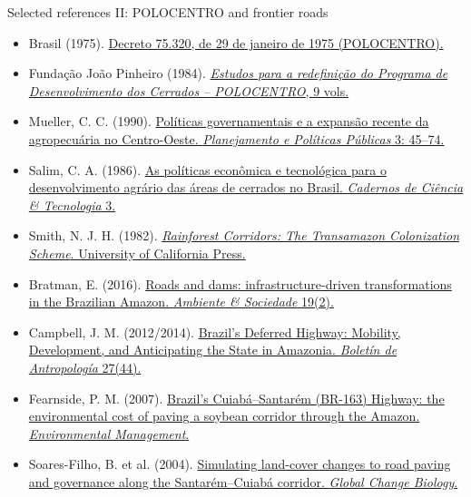 \documentclass[aspectratio=169,10pt]{beamer}
\begin{document}
\begin{frame}{Selected references II: POLOCENTRO and frontier roads}
\tiny
\begin{itemize}\setlength\itemsep{0.35em}
  \item Brasil (1975). \href{https://www2.camara.leg.br/legin/fed/decret/1970-1979/decreto-75320-29-janeiro-1975-423871-publicacaooriginal-1-pe.html}{Decreto 75.320, de 29 de janeiro de 1975 (POLOCENTRO).}
  \item Fundação João Pinheiro (1984). \href{https://www.bibliotecadigital.mg.gov.br/consulta/consultaDetalheDocumento.php?iCodDocumento=55206}{\textit{Estudos para a redefinição do Programa de Desenvolvimento dos Cerrados -- POLOCENTRO}, 9 vols.}
  \item Mueller, C. C. (1990). \href{https://repositorio.ipea.gov.br/bitstream/11058/14764/1/ppp_n3_completo.pdf}{Políticas governamentais e a expansão recente da agropecuária no Centro-Oeste. \textit{Planejamento e Políticas Públicas} 3: 45--74.}
  \item Salim, C. A. (1986). \href{https://doi.org/10.35977/0104-1096.cct1986.v3.9213}{As políticas econômica e tecnológica para o desenvolvimento agrário das áreas de cerrados no Brasil. \textit{Cadernos de Ciência \& Tecnologia} 3.}
  \item Smith, N. J. H. (1982). \href{https://doi.org/10.1525/9780520314320}{\textit{Rainforest Corridors: The Transamazon Colonization Scheme}. University of California Press.}
  \item Bratman, E. (2016). \href{https://doi.org/10.1590/1809-4422ASOC256V1922016}{Roads and dams: infrastructure-driven transformations in the Brazilian Amazon. \textit{Ambiente \& Sociedade} 19(2).}
  \item Campbell, J. M. (2012/2014). \href{https://docs.rwu.edu/fcas_fp/151/}{Brazil's Deferred Highway: Mobility, Development, and Anticipating the State in Amazonia. \textit{Boletín de Antropología} 27(44).}
  \item Fearnside, P. M. (2007). \href{https://repositorio.inpa.gov.br/items/72737248-5a0c-42dd-adf3-82b4a9d622d6}{Brazil's Cuiabá--Santarém (BR-163) Highway: the environmental cost of paving a soybean corridor through the Amazon. \textit{Environmental Management}.}
  \item Soares-Filho, B. et al. (2004). \href{https://ipam.org.br/bibliotecas/simulating-the-response-of-land-cover-changes-to-road-paving-and-governance-along-a-major-amazon-highway-the-santarem-cuiaba-corridor/}{Simulating land-cover changes to road paving and governance along the Santarém--Cuiabá corridor. \textit{Global Change Biology}.}

\end{itemize}
\end{frame}
\end{document}
